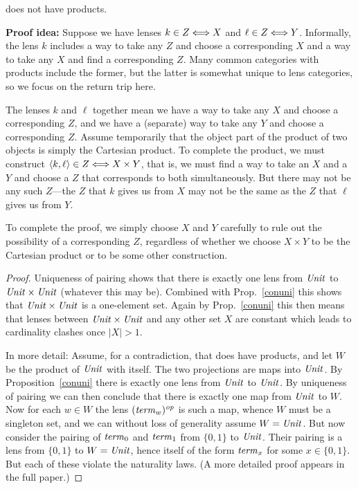 \begin{defn}[$R$-similarity]
\begin{theorem}
\begin{lemma}
\iffull
\begin{theorem}[No products]\label{noprod}
\else
\begin{theorem}\label{noprod}
\fi
  \LENS{} does not have products.
\end{theorem}
{\bf Proof idea:} Suppose we have lenses $k \in Z \Longleftrightarrow X$ and $\ell \in Z
\Longleftrightarrow Y$. Informally, the lens $k$ includes a way to take any $Z$ and choose
a corresponding $X$ and a way to take any $X$ and find a corresponding $Z$.
Many common categories with products include the former, but the latter is
somewhat unique to lens categories, so we focus on the return trip here.

The lenses $k$ and $\ell$ together mean we have a way to take any $X$ and
choose a
corresponding $Z$, and we have a (separate) way to take any $Y$ and choose a
corresponding $Z$. Assume temporarily that the object part of the product of
two objects is simply the Cartesian product. To complete the product, we
must construct $\left<k,\ell\right> \in Z \Longleftrightarrow X \times Y$, that is, we
must find a way to take an $X$ and a $Y$ and choose a $Z$ that
corresponds to both simultaneously. But there may not be any such $Z$---the
$Z$ that $k$ gives us from $X$ may not be the same as the $Z$ that $\ell$
gives us from $Y$.

To complete the proof, we simply choose $X$ and $Y$ carefully to rule out
the possibility of a corresponding $Z$, regardless of whether we choose $X
\times Y$ to be the Cartesian product or to be some other construction.

\begin{proof}
Uniqueness of pairing shows that there is exactly one lens from $\mathit{Unit}$ to
$\mathit{Unit}\times \mathit{Unit}$ (whatever this may be). Combined with Prop.~\ref{conuni}
this shows that $\mathit{Unit}\times \mathit{Unit}$ is a one-element set. Again by Prop.~\ref{conuni} 
this then means that lenses 
between $\mathit{Unit}\times\mathit{Unit}$ and any other set $X$ are constant which leads to cardinality clashes once $|X|>1$. 
\iffull 

In more detail: 
  Assume, for a contradiction, that \LENS{} does have products, and let $W$
  be the 
  product of $\mathit{Unit}$ with itself. The two projections are maps into
  $\mathit{Unit}$. By Proposition~\ref{conuni} there is exactly one lens from
  $\mathit{Unit}$ to $\mathit{Unit}$. By uniqueness of pairing we can then conclude
  that there is exactly one map from $\mathit{Unit}$ to $W$. Now for each
  $w\in W$ the lens $(\mathit{term}_w)^\mathit{op}$ is such a map, whence $W$ must be a
  singleton set, and we can without loss of generality assume
  $W=\mathit{Unit}$.  But now consider the pairing of $\mathit{term}_{0}$ and
  $\mathit{term}_{1}$ from $\{0,1\}$ to $\mathit{Unit}$. Their pairing is a lens from
  $\{0,1\}$ to $W=\mathit{Unit}$, hence itself of the form $\mathit{term}_x$ for some
  $x\in\{0,1\}$. But each of these violate the naturality laws.
%
\else
(A more detailed proof
appears in the full paper.)
\fi
\end{proof}


\end{theorem}
\end{lemma}
\end{theorem}
\end{defn}
